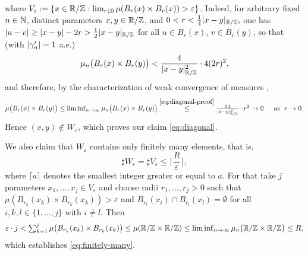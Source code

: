 where $V_\varepsilon:=\{x\in\mathbb{R}/\mathbb{Z}:\lim_{r\downarrow 0}\mu(B_r(x)\times B_r(x))>
\varepsilon\}$.
Indeed, for arbitrary fixed $n\in\mathbb{N}$, distinct parameters
$x,y\in\mathbb{R}/\mathbb{Z}$, and $0<r<\frac14 |x-y|_{\mathbb{R}/\mathbb{Z}},$ one has
$|u-v|\ge |x-y|-2r >\frac12 |x-y|_{\mathbb{R}/\mathbb{Z}}$ for all $u\in B_r(x)$,
$v\in B_r(y)$, so that (with $|\gamma_n'|=1$ a.e.)
\begin{equation}\label{eq:diagonal-proof}
\mu_n\big(B_r(x)\times B_r(y)\big) < \frac4{|x-y|_{\mathbb{R}/\mathbb{Z}}^2}\cdot 4(2r)^2,
\end{equation}
and therefore, by the characterization of weak convergence
of measures \cite[Theorem~1.40]{evans-gariepy_2015},
$$
\textstyle
\mu\big(B_r(x)\times B_r(y)\big)\le\liminf_{n\to\infty}
\mu_n\big(B_r(x)\times B_r(y)\big)\overset{\eqref{eq:diagonal-proof}}{\le}
\frac{64}{|x-y|^2_{\mathbb{R}/\mathbb{Z}}}\cdot r^2\to 0\quad\,\,\,\text{as }\,\, r\to 0.
$$
Hence $(x,y)\not\in W_\varepsilon$, which proves our claim 
\eqref{eq:diagonal}.

We also claim that $W_\varepsilon$ contains only finitely many elements,
that is,
\begin{equation}\label{eq:finitely-many}
\textstyle
\sharp W_\varepsilon =\sharp V_\varepsilon\le\lceil \frac{R}\varepsilon
\rceil,
\end{equation}
where $\lceil a\rceil$ denotes the smallest integer greater or equal to $a$.
For that take $j$ parameters $x_1,\ldots, x_j\in V_\varepsilon$ and
choose radii $r_1,\ldots,r_j>0$ such that
$\mu(B_{r_k}(x_k)\times B_{r_k}(x_k))>\varepsilon$ and
$B_{r_i}(x_i)\cap B_{r_l}(x_l)=\emptyset $ for all $i,k,l\in
\{1,\ldots,j\}$ with $i\not= l$.
Then
$$
\textstyle
\varepsilon\cdot j< \sum_{k=1}^j
\mu\big(B_{r_k}(x_k)\times B_{r_k}(x_k)\big)\le
\mu(\mathbb{R}/\mathbb{Z}\times \mathbb{R}/\mathbb{Z})\le \liminf_{n\to\infty}\mu_n\big(\mathbb{R}/\mathbb{Z}\times
\mathbb{R}/\mathbb{Z}\big)\le R,
$$
which establishes \eqref{eq:finitely-many}.

